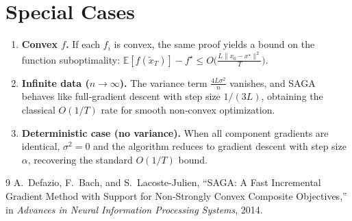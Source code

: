 \documentclass[11pt]{article}
\newcommand{\EE}{\mathbb{E}}
\begin{document}
\section*{Special Cases}
\begin{enumerate}[label=(\alph*)]
    \item \textbf{Convex $f$.}  If each $f_i$ is convex, the same proof yields a bound on the function suboptimality:
    $\EE[f(\tilde x_T)]-f^\star\le O\!\big(\frac{L\|x_0-x^\star\|^{2}}{T}\big)$.
    \item \textbf{Infinite data ($n\to\infty$).}  The variance term $\frac{4L\sigma^{2}}{n}$ vanishes, and SAGA behaves like full‑gradient descent with step size $1/(3L)$, obtaining the classical $O(1/T)$ rate for smooth non‑convex optimization.
    \item \textbf{Deterministic case (no variance).}  When all component gradients are identical, $\sigma^{2}=0$ and the algorithm reduces to gradient descent with step size $\alpha$, recovering the standard $O(1/T)$ bound.
\end{enumerate}

\begin{thebibliography}{9}
A.~Defazio, F.~Bach, and S.~Lacoste-Julien,
\newblock ``SAGA: A Fast Incremental Gradient Method with Support for Non‑Strongly Convex Composite Objectives,''
\newblock in \emph{Advances in Neural Information Processing Systems}, 2014.
\end{thebibliography}
\end{document}
